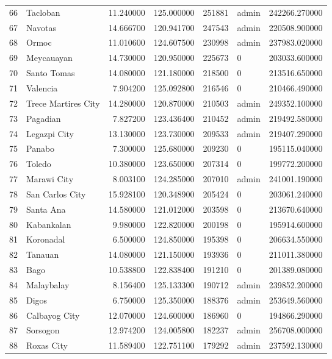 \begin{longtable}{rlrrrlr}
66 & Tacloban & 11.240000 & 125.000000 & 251881 & admin & 242266.270000 \\
67 & Navotas & 14.666700 & 120.941700 & 247543 & admin & 220508.900000 \\
68 & Ormoc & 11.010600 & 124.607500 & 230998 & admin & 237983.020000 \\
69 & Meycauayan & 14.730000 & 120.950000 & 225673 & 0 & 203033.600000 \\
70 & Santo Tomas & 14.080000 & 121.180000 & 218500 & 0 & 213516.650000 \\
71 & Valencia & 7.904200 & 125.092800 & 216546 & 0 & 210466.490000 \\
72 & Trece Martires City & 14.280000 & 120.870000 & 210503 & admin & 249352.100000 \\
73 & Pagadian & 7.827200 & 123.436400 & 210452 & admin & 219492.580000 \\
74 & Legazpi City & 13.130000 & 123.730000 & 209533 & admin & 219407.290000 \\
75 & Panabo & 7.300000 & 125.680000 & 209230 & 0 & 195115.040000 \\
76 & Toledo & 10.380000 & 123.650000 & 207314 & 0 & 199772.200000 \\
77 & Marawi City & 8.003100 & 124.285000 & 207010 & admin & 241001.190000 \\
78 & San Carlos City & 15.928100 & 120.348900 & 205424 & 0 & 203061.240000 \\
79 & Santa Ana & 14.580000 & 121.012000 & 203598 & 0 & 213670.640000 \\
80 & Kabankalan & 9.980000 & 122.820000 & 200198 & 0 & 195914.600000 \\
81 & Koronadal & 6.500000 & 124.850000 & 195398 & 0 & 206634.550000 \\
82 & Tanauan & 14.080000 & 121.150000 & 193936 & 0 & 211011.380000 \\
83 & Bago & 10.538800 & 122.838400 & 191210 & 0 & 201389.080000 \\
84 & Malaybalay & 8.156400 & 125.133300 & 190712 & admin & 239852.200000 \\
85 & Digos & 6.750000 & 125.350000 & 188376 & admin & 253649.560000 \\
86 & Calbayog City & 12.070000 & 124.600000 & 186960 & 0 & 194866.290000 \\
87 & Sorsogon & 12.974200 & 124.005800 & 182237 & admin & 256708.000000 \\
88 & Roxas City & 11.589400 & 122.751100 & 179292 & admin & 237592.130000 \\

\end{longtable}
